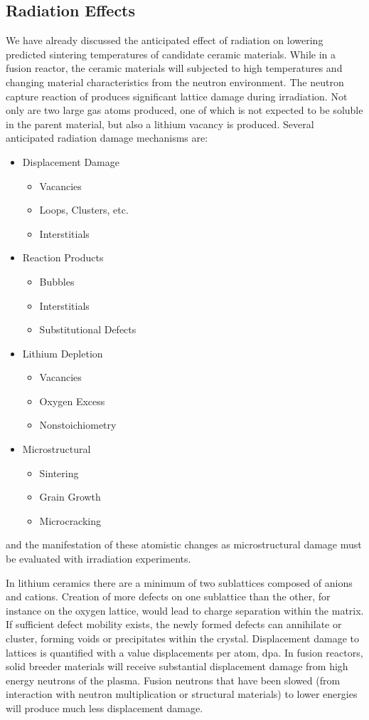 \documentclass[11pt]{report} %
\begin{document}
\subsection{Radiation Effects}
We have already discussed the anticipated effect of radiation on lowering predicted sintering temperatures of candidate ceramic materials. While in a fusion reactor, the ceramic materials will subjected to high temperatures and changing material characteristics from the neutron environment. The neutron capture reaction of  produces significant lattice damage during irradiation.\cite{Johnson1981} Not only are two large gas atoms produced, one of which is not expected to be soluble in the parent material, but also a lithium vacancy is produced. Several anticipated radiation damage mechanisms are:
\begin{itemize}
\item Displacement Damage
	\begin{itemize}
	\item Vacancies
	\item Loops, Clusters, etc.
	\item Interstitials
	\end{itemize}
\item Reaction Products
	\begin{itemize}
	\item Bubbles
	\item Interstitials
	\item Substitutional Defects
	\end{itemize}
\item Lithium Depletion
	\begin{itemize}
	\item Vacancies
	\item Oxygen Excess
	\item Nonstoichiometry
	\end{itemize}
\item Microstructural
	\begin{itemize}
	\item Sintering
	\item Grain Growth
	\item Microcracking
	\end{itemize}
\end{itemize}
and the manifestation of these atomistic changes as microstructural damage must be evaluated with irradiation experiments.

In lithium ceramics there are a minimum of two sublattices composed of anions and cations. Creation of more defects on one sublattice than the other, for instance on the oxygen lattice, would lead to charge separation within the matrix. If sufficient defect mobility exists, the newly formed defects can annihilate or cluster, forming voids or precipitates within the crystal. Displacement damage to lattices is quantified with a value displacements per atom, dpa. In fusion reactors, solid breeder materials will receive substantial displacement damage from high energy neutrons of the plasma. Fusion neutrons that have been slowed (from interaction with neutron multiplication or structural materials) to lower energies will produce much less displacement damage.
\end{document}
